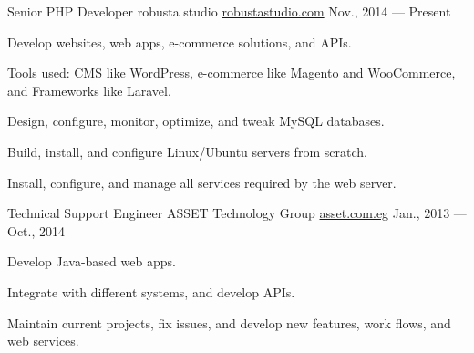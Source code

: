 


\begin{cventries}

  \cventry
    {Senior PHP Developer} %
    {robusta studio} %
    {\href{http://robustastudio.com} {robustastudio.com}} %
    {Nov., 2014 — Present} %
    {
      \begin{cvitems} %
        \item {Develop websites, web apps, e-commerce solutions, and APIs. }
        \item {Tools used: CMS like WordPress, e-commerce like Magento and WooCommerce, and Frameworks like Laravel.}
        \item {Design, configure, monitor, optimize, and tweak MySQL databases.}
        \item {Build, install, and configure Linux/Ubuntu servers from scratch.}
        \item {Install, configure, and manage all services required by the web server.}
      \end{cvitems}
    }


  \cventry
    {Technical Support Engineer} %
    {ASSET Technology Group} %
    {\href{http://asset.com.eg} {asset.com.eg}} %
    {Jan., 2013 — Oct., 2014} %
    {
      \begin{cvitems} %
        \item {Develop Java-based web apps.}
        \item {Integrate with different systems, and develop APIs.}
        \item {Maintain current projects, fix issues, and develop new features, work flows, and web services.}
      \end{cvitems}
    }


\end{cventries}


